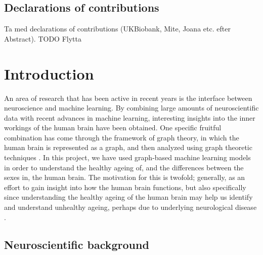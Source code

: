 \section{Declarations of contributions}
Ta med declarations of contributions (UKBiobank, Mite, Joana etc. efter Abstract).
TODO Flytta

\chapter{Introduction}




An area of research that has been active in recent years is the interface between neuroscience and machine learning. By combining large amounts of neuroscientific data with recent advances in machine learning, interesting insights into the inner workings of the human brain have been obtained. One specific fruitful combination has come through the framework of graph theory, in which the human brain is represented as a graph, and then analyzed using graph theoretic techniques \cite{chan}. In this project, we have used graph-based machine learning models in order to understand the healthy ageing of, and the differences between the sexes in, the human brain. The motivation for this is twofold; generally, as an effort to gain insight into how the human brain functions, but also specifically since understanding the healthy ageing of the human brain may help us identify and understand unhealthy ageing, perhaps due to underlying neurological disease \cite{kaufmann}. 


\section{Neuroscientific background}


